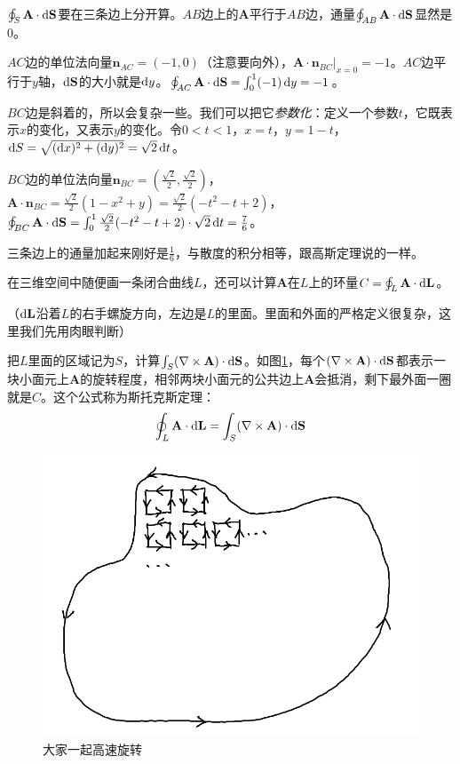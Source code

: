 $\oint_S \mathbf{A} \cdot \mathop{}\!\mathrm{d} \mathbf{S}$要在三条边上分开算。$AB$边上的$\mathbf{A}$平行于$AB$边，通量$\oint_{AB} \mathbf{A} \cdot \mathop{}\!\mathrm{d} \mathbf{S}$显然是0。

$AC$边的单位法向量$\mathbf{n}_{AC}=(-1,0)$（注意要向外），$\mathbf{A} \cdot \mathbf{n}_{BC}|_{x=0}=-1$。$AC$边平行于$y$轴，$\mathop{}\!\mathrm{d} \mathbf{S}$的大小就是$\mathop{}\!\mathrm{d} y$。$\oint_{AC} \mathbf{A} \cdot \mathop{}\!\mathrm{d} \mathbf{S}=\int_0^1 (-1) \mathop{}\!\mathrm{d} y=-1$。

$BC$边是斜着的，所以会复杂一些。我们可以把它\emph{参数化}：定义一个参数$t$，它既表示$x$的变化，又表示$y$的变化。令$0<t<1$，$x=t$，$y=1-t$，$\mathop{}\!\mathrm{d} S=\sqrt{(\mathop{}\!\mathrm{d} x)^2+(\mathop{}\!\mathrm{d} y)^2}=\sqrt{2} \mathop{}\!\mathrm{d} t$。

$BC$边的单位法向量$\mathbf{n}_{BC}=(\frac{\sqrt{2}}{2},\frac{\sqrt{2}}{2})$，$\mathbf{A} \cdot \mathbf{n}_{BC}=\frac{\sqrt{2}}{2}(1-x^2+y)=\frac{\sqrt{2}}{2}(-t^2-t+2)$，$\oint_{BC} \mathbf{A} \cdot \mathop{}\!\mathrm{d} \mathbf{S}=\int_0^1 \frac{\sqrt{2}}{2}(-t^2-t+2) \cdot \sqrt{2} \mathop{}\!\mathrm{d} t=\frac{7}{6}$。

三条边上的通量加起来刚好是$\frac{1}{6}$，与散度的积分相等，跟高斯定理说的一样。

在三维空间中随便画一条闭合曲线$L$，还可以计算$\mathbf{A}$在$L$上的环量$C=\oint_L \mathbf{A} \cdot \mathop{}\!\mathrm{d} \mathbf{L}$。

（$\mathop{}\!\mathrm{d} \mathbf{L}$沿着$L$的右手螺旋方向，左边是$L$的里面。里面和外面的严格定义很复杂，这里我们先用肉眼判断）

把$L$里面的区域记为$S$，计算$\int_S (\nabla \times \mathbf{A}) \cdot \mathop{}\!\mathrm{d} \mathbf{S}$。如图\ref{fig-stokes-prove}，每个$(\nabla \times \mathbf{A}) \cdot \mathop{}\!\mathrm{d} \mathbf{S}$都表示一块小面元上$\mathbf{A}$的旋转程度，相邻两块小面元的公共边上$\mathbf{A}$会抵消，剩下最外面一圈就是$C$。这个公式称为斯托克斯定理：
\begin{equation*}
\oint_L \mathbf{A} \cdot \mathop{}\!\mathrm{d} \mathbf{L}=\int_S (\nabla \times \mathbf{A}) \cdot \mathop{}\!\mathrm{d} \mathbf{S}
\end{equation*}
\begin{figure}[htb]
\centering
\includegraphics[width=0.33\linewidth]{fig/stokes-prove.png}
\caption{大家一起高速旋转}
\label{fig-stokes-prove}
\end{figure}

